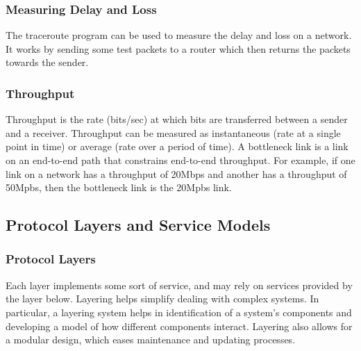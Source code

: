 \documentclass[12pt,titlepage]{article}
\begin{document}
      \subsubsection{Measuring Delay and Loss}
        The traceroute program can be used to measure the delay and loss on a network. It works by sending some test packets to a router which
        then returns the packets towards the sender.

      \subsubsection{Throughput}
        Throughput is the rate (bits/sec) at which bits are transferred between a sender and a receiver. Throughput can be measured as instantaneous
        (rate at a single point in time) or average (rate over a period of time). A bottleneck link is a link on an end-to-end path that constrains
        end-to-end throughput. For example, if one link on a network has a throughput of 20Mbps and another has a throughput of 50Mpbs, then the
        bottleneck link is the 20Mpbs link.

    \subsection{Protocol Layers and Service Models}
      \subsubsection{Protocol Layers}
        Each layer implements some sort of service, and may rely on services provided by the layer below. Layering helps simplify dealing with
        complex systems. In particular, a layering system helps in identification of a system's components and developing a model of how different
        components interact. Layering also allows for a modular design, which eases maintenance and updating processes.
\end{document}
